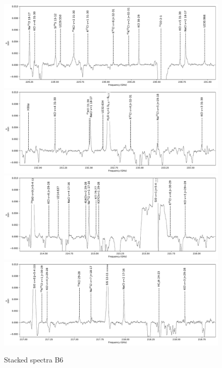 \documentclass[twocolumn]{aastex62}
\begin{document}
\begin{figure}[!htp]
\includegraphics[scale=1,width=5.5in]{figures/lines_labeled_OrionSourceI_B6_spw0_robust0.5.pdf}
\includegraphics[scale=1,width=5.5in]{figures/lines_labeled_OrionSourceI_B6_spw1_robust0.5.pdf}
\includegraphics[scale=1,width=5.5in]{figures/lines_labeled_OrionSourceI_B6_spw2_robust0.5.pdf}
\includegraphics[scale=1,width=5.5in]{figures/lines_labeled_OrionSourceI_B6_spw3_robust0.5.pdf}
\caption{Stacked spectra B6}
\label{fig:spectrab6}
\end{figure}
\end{document}
